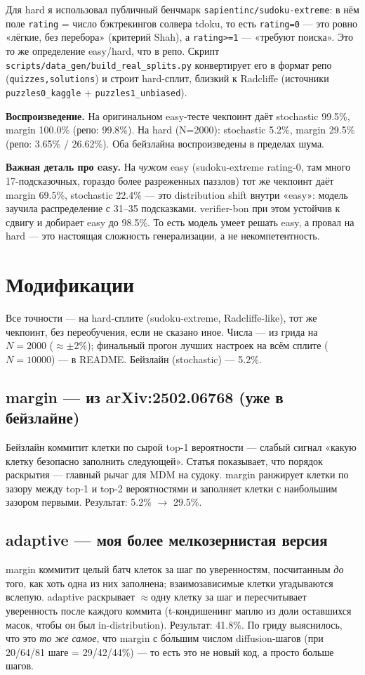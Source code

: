 \documentclass[11pt]{article}
\newcommand{\code}[1]{\texttt{#1}}
\begin{document}
Для hard я использовал публичный бенчмарк \code{sapientinc/sudoku-extreme}: в нём поле \code{rating} = число
бэктрекингов солвера tdoku, то есть \code{rating=0} — это ровно «лёгкие, без перебора» (критерий Shah), а
\code{rating>=1} — «требуют поиска». Это то же определение easy/hard, что в репо. Скрипт
\code{scripts/data_gen/build_real_splits.py} конвертирует его в формат репо (\code{quizzes,solutions}) и
строит hard-сплит, близкий к Radcliffe (источники \code{puzzles0_kaggle} + \code{puzzles1_unbiased}).

\textbf{Воспроизведение.} На оригинальном easy-тесте чекпоинт даёт stochastic 99.5\%, margin 100.0\%
(репо: 99.8\%). На hard (N=2000): stochastic 5.2\%, margin 29.5\% (репо: 3.65\% / 26.62\%). Оба бейзлайна
воспроизведены в пределах шума.

\textbf{Важная деталь про easy.} На \emph{чужом} easy (sudoku-extreme rating-0, там много 17-подсказочных,
гораздо более разреженных паззлов) тот же чекпоинт даёт margin 69.5\%, stochastic 22.4\% — это
distribution shift внутри «easy»: модель заучила распределение с 31–35 подсказками. verifier-bon при этом
устойчив к сдвигу и добирает easy до 98.5\%. То есть модель умеет решать easy, а провал на hard — это
настоящая сложность генерализации, а не некомпетентность.

\section{Модификации}

Все точности — на hard-сплите (sudoku-extreme, Radcliffe-like), тот же чекпоинт, без переобучения, если не
сказано иное. Числа — из грида на $N{=}2000$ ($\approx\pm$2\%); финальный прогон лучших настроек на всём
сплите ($N{=}10000$) — в README. Бейзлайн (stochastic) — 5.2\%.

\subsection{margin — из arXiv:2502.06768 (уже в бейзлайне)}
Бейзлайн коммитит клетки по сырой top-1 вероятности — слабый сигнал «какую клетку безопасно заполнить
следующей». Статья показывает, что порядок раскрытия — главный рычаг для MDM на судоку. margin ранжирует
клетки по зазору между top-1 и top-2 вероятностями и заполняет клетки с наибольшим зазором первыми.
Результат: 5.2\% $\to$ 29.5\%.

\subsection{adaptive — моя более мелкозернистая версия}
margin коммитит целый батч клеток за шаг по уверенностям, посчитанным \emph{до} того, как хоть одна из них
заполнена; взаимозависимые клетки угадываются вслепую. adaptive раскрывает $\approx$одну клетку за шаг и
пересчитывает уверенность после каждого коммита (t-кондишенинг маплю из доли оставшихся масок, чтобы он был
in-distribution). Результат: 41.8\%. По гриду выяснилось, что это \emph{то же самое}, что margin с бо́льшим
числом diffusion-шагов (при 20/64/81 шаге = 29/42/44\%) — то есть это не новый код, а просто больше шагов.
\end{document}
